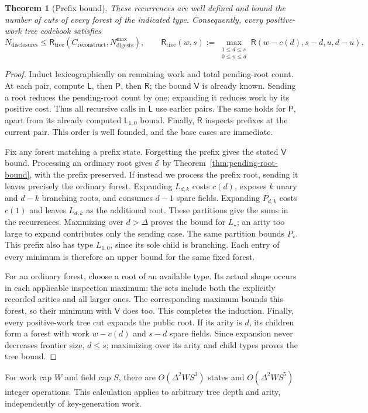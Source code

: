 \documentclass[10pt]{article}
\newtheorem{theorem}[proposition]{Theorem}
\newcommand{\disclosurecount}{N_{\mathrm{disclosures}}}
\newcommand{\digestbudget}{N_{\mathrm{digests}}^{\max}}
\newcommand{\reconstructcost}{C_{\mathrm{reconstruct}}}
\begin{document}
\begin{theorem}[Prefix bound]\label{thm:prefix-bound}
These recurrences are well defined and bound the number of cuts of every forest of the indicated type. Consequently, every positive-work tree codebook satisfies
\[
 \disclosurecount\le\mathsf R_{\mathrm{tree}}(\reconstructcost,\digestbudget),\qquad \mathsf R_{\mathrm{tree}}(w,s):=\max_{\substack{1\le d\le s\\0\le u\le d}}\mathsf R(w-c(d),s-d,u,d-u).
\]
\end{theorem}
\begin{proof}
Induct lexicographically on remaining work and total pending-root count. At each pair, compute $\mathsf L$, then $\mathsf P$, then $\mathsf R$; the bound $\mathsf V$ is already known. Sending a root reduces the pending-root count by one; expanding it reduces work by its positive cost. Thus all recursive calls in $\mathsf L$ use earlier pairs. The same holds for $\mathsf P$, apart from its already computed $\mathsf L_{1,0}$ bound. Finally, $\mathsf R$ inspects prefixes at the current pair. This order is well founded, and the base cases are immediate.

Fix any forest matching a prefix state. Forgetting the prefix gives the stated $\mathsf V$ bound. Processing an ordinary root gives $\mathcal E$ by Theorem~\ref{thm:pending-root-bound}, with the prefix preserved. If instead we process the prefix root, sending it leaves precisely the ordinary forest. Expanding $L_{d,k}$ costs $c(d)$, exposes $k$ unary and $d-k$ branching roots, and consumes $d-1$ spare fields. Expanding $P_{d,k}$ costs $c(1)$ and leaves $L_{d,k}$ as the additional root. These partitions give the sums in the recurrences. Maximizing over $d>\Delta$ proves the bound for $L_\star$; an arity too large to expand contributes only the sending case. The same partition bounds $P_\star$. This prefix also has type $L_{1,0}$, since its sole child is branching. Each entry of every minimum is therefore an upper bound for the same fixed forest.

For an ordinary forest, choose a root of an available type. Its actual shape occurs in each applicable inspection maximum: the sets include both the explicitly recorded arities and all larger ones. The corresponding maximum bounds this forest, so their minimum with $\mathsf V$ does too. This completes the induction. Finally, every positive-work tree cut expands the public root. If its arity is $d$, its children form a forest with work $w-c(d)$ and $s-d$ spare fields. Since expansion never decreases frontier size, $d\le s$; maximizing over its arity and child types proves the tree bound.
\end{proof}
For work cap $W$ and field cap $S$, there are $O(\Delta^2WS^3)$ states and $O(\Delta^2WS^5)$ integer operations. This calculation applies to arbitrary tree depth and arity, independently of key-generation work.
\end{document}

